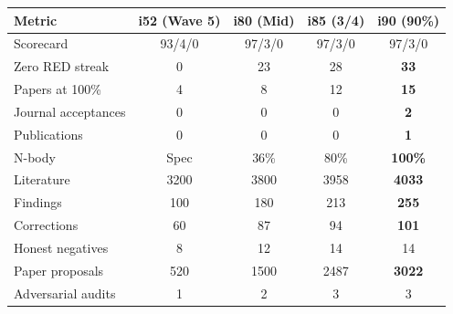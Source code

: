 \documentclass[11pt,a4paper]{article}
\begin{document}
\begin{center}
\begin{tabular}{lcccc}
\toprule
\textbf{Metric} & \textbf{i52 (Wave 5)} & \textbf{i80 (Mid)} & \textbf{i85 (3/4)} & \textbf{i90 (90\%)} \\
\midrule
Scorecard & 93/4/0 & 97/3/0 & 97/3/0 & 97/3/0 \\
Zero RED streak & 0 & 23 & 28 & \textbf{33} \\
Papers at 100\% & 4 & 8 & 12 & \textbf{15} \\
Journal acceptances & 0 & 0 & 0 & \textbf{2} \\
Publications & 0 & 0 & 0 & \textbf{1} \\
N-body & Spec & 36\% & 80\% & \textbf{100\%} \\
Literature & 3200 & 3800 & 3958 & \textbf{4033} \\
Findings & 100 & 180 & 213 & \textbf{255} \\
Corrections & 60 & 87 & 94 & \textbf{101} \\
Honest negatives & 8 & 12 & 14 & 14 \\
Paper proposals & 520 & 1500 & 2487 & \textbf{3022} \\
Adversarial audits & 1 & 2 & 3 & 3 \\
\bottomrule
\end{tabular}
\end{center}
\end{document}
